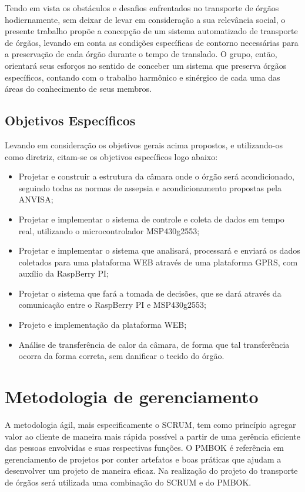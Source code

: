 Tendo em vista os obstáculos e desafios enfrentados no transporte de órgãos hodiernamente, sem deixar de levar em consideração a sua relevância social, o presente trabalho propõe a concepção de um sistema automatizado de transporte de órgãos, levando em conta as condições específicas de contorno necessárias para a preservação de cada órgão durante o tempo de translado. O grupo, então, orientará seus esforços no sentido de conceber um sistema que preserva órgãos específicos, contando com o trabalho harmônico e sinérgico de cada uma das áreas do conhecimento de seus membros.

\subsection{Objetivos Específicos}

Levando em consideração os objetivos gerais acima propostos, e utilizando-os como diretriz, citam-se os objetivos específicos logo abaixo:

\begin{itemize}
	\item Projetar e construir a estrutura da câmara onde o órgão será acondicionado, seguindo todas as normas de assepsia e acondicionamento propostas pela ANVISA;
    \item Projetar e implementar o sistema de controle e coleta de dados em tempo real, utilizando o microcontrolador MSP430g2553;
	\item Projetar e implementar o sistema que analisará, processará e enviará os dados coletados para uma plataforma WEB através de uma plataforma GPRS, com auxílio da RaspBerry PI;
	\item Projetar o sistema que fará a tomada de decisões, que se dará através da comunicação entre o RaspBerry PI e MSP430g2553; 

\item Projeto e implementação da plataforma WEB;
	\item Análise de transferência de calor da câmara, de forma que tal transferência ocorra da forma correta, sem danificar o tecido do órgão. 
\end{itemize}

\section{Metodologia de gerenciamento}

A metodologia ágil, mais especificamente o SCRUM, tem como princípio agregar valor ao cliente de maneira mais rápida possível a partir de uma gerência eficiente das pessoas envolvidas e suas respectivas funções. O PMBOK é referência em gerenciamento de projetos por conter artefatos e boas práticas que ajudam a desenvolver um projeto de maneira eficaz. Na realização do projeto do transporte de órgãos será utilizada uma combinação do SCRUM e do PMBOK.

